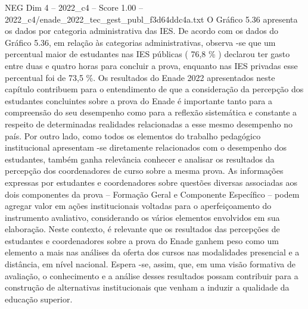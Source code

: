 \begin{textsample}{NEG Dim 4 – 2022\_c4 – Score 1.00 – 2022\_c4/enade\_2022\_tec\_gest\_publ\_f3d64ddc4a.txt}
O Gráfico 5.36 apresenta os dados por categoria administrativa das IES.
De acordo com os dados do Gráfico 5.36, em relação às categorias administrativas, observa -se que um percentual maior de estudantes nas IES públicas ( 76,8 \% ) declarou ter gasto entre duas e quatro horas para concluir a prova, enquanto nas IES privadas esse percentual foi de 73,5 \%.
Os resultados do Enade 2022 apresentados neste capítulo contribuem para o entendimento de que a consideração da percepção dos estudantes concluintes sobre a prova do Enade é importante tanto para a compreensão do seu desempenho como para a reflexão sistemática e constante a respeito de determinadas realidades relacionadas a esse mesmo desempenho no país.
Por outro lado, como todos os elementos do trabalho pedagógico institucional apresentam -se diretamente relacionados com o desempenho dos estudantes, também ganha relevância conhecer e analisar os resultados da percepção dos coordenadores de curso sobre a mesma prova.
As informações expressas por estudantes e coordenadores sobre questões diversas associadas aos dois componentes da prova – Formação Geral e Componente Específico – podem agregar valor em ações institucionais voltadas para o aperfeiçoamento do instrumento avaliativo, considerando os vários elementos envolvidos em sua elaboração.
Neste contexto, é relevante que os resultados das percepções de estudantes e coordenadores sobre a prova do Enade ganhem peso como um elemento a mais nas análises da oferta dos cursos nas modalidades presencial e a distância, em nível nacional.
Espera -se, assim, que, em uma visão formativa de avaliação, o conhecimento e a análise desses resultados possam contribuir para a construção de alternativas institucionais que venham a induzir a qualidade da educação superior.

\end{textsample}
